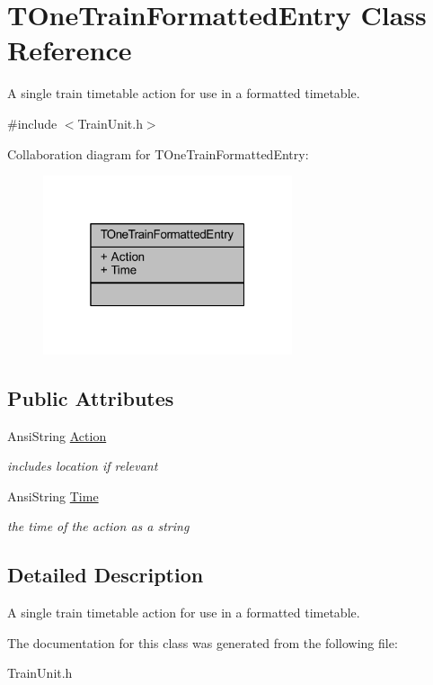 \hypertarget{class_t_one_train_formatted_entry}{}\section{T\+One\+Train\+Formatted\+Entry Class Reference}
\label{class_t_one_train_formatted_entry}


A single train timetable action for use in a formatted timetable.  




{\ttfamily \#include $<$Train\+Unit.\+h$>$}



Collaboration diagram for T\+One\+Train\+Formatted\+Entry\+:\nopagebreak
\begin{figure}[H]
\begin{center}
\leavevmode
\includegraphics[width=208pt]{class_t_one_train_formatted_entry__coll__graph}
\end{center}
\end{figure}
\subsection*{Public Attributes}
\begin{DoxyCompactItemize}
\item 
\mbox{\label{class_t_one_train_formatted_entry_aed96f14cc0862be5da673e206090e6d6}} 
Ansi\+String \mbox{\hyperlink{class_t_one_train_formatted_entry_aed96f14cc0862be5da673e206090e6d6}{Action}}
\begin{DoxyCompactList}\small\item\em includes location if relevant \end{DoxyCompactList}\item 
\mbox{\label{class_t_one_train_formatted_entry_a1731ee3ca7f8f0a0e7a5d048737bdeec}} 
Ansi\+String \mbox{\hyperlink{class_t_one_train_formatted_entry_a1731ee3ca7f8f0a0e7a5d048737bdeec}{Time}}
\begin{DoxyCompactList}\small\item\em the time of the action as a string \end{DoxyCompactList}\end{DoxyCompactItemize}


\subsection{Detailed Description}
A single train timetable action for use in a formatted timetable. 

The documentation for this class was generated from the following file\+:\begin{DoxyCompactItemize}
\item 
Train\+Unit.\+h\end{DoxyCompactItemize}
